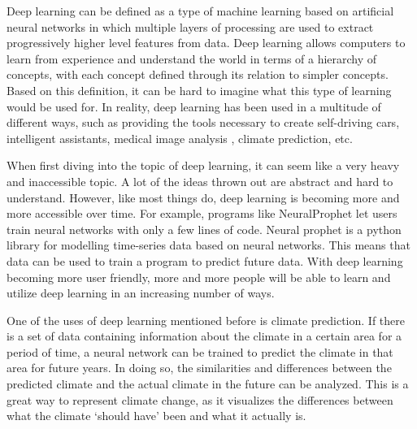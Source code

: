 \documentclass[11pt,a4paper,fleqn]{article}
\begin{document}
Deep learning can be defined as a type of machine learning based on artificial neural networks in which multiple layers of processing are used to extract progressively higher level features from data. Deep learning allows computers to learn from experience and understand the world in terms of a hierarchy of concepts, with each concept defined through its relation to simpler concepts.\cite{Goodfellow-et-al-2016} Based on this definition, it can be hard to imagine what this type of learning would be used for. In reality, deep learning has been used in a multitude of different ways, such as providing the tools necessary to create self-driving cars, intelligent assistants, medical image analysis \cite{ker2017deep}, climate prediction, etc. \par
When first diving into the topic of deep learning, it can seem like a very heavy and inaccessible topic. A lot of the ideas thrown out are abstract and hard to understand. However, like most things do, deep learning is becoming more and more accessible over time. For example, programs like NeuralProphet let users train neural networks with only a few lines of code. Neural prophet is a python library for modelling time-series data based on neural networks. This means that data can be used to train a program to predict future data. With deep learning becoming more user friendly, more and more people will be able to learn and utilize deep learning in an increasing number of ways. \par
One of the uses of deep learning mentioned before is climate prediction. If there is a set of data containing information about the climate in a certain area for a period of time, a neural network can be trained to predict the climate in that area for future years. In doing so, the similarities and differences between the predicted climate and the actual climate in the future can be analyzed. This is a great way to represent climate change, as it visualizes the differences between what the climate `should have' been and what it actually is.
\end{document}
